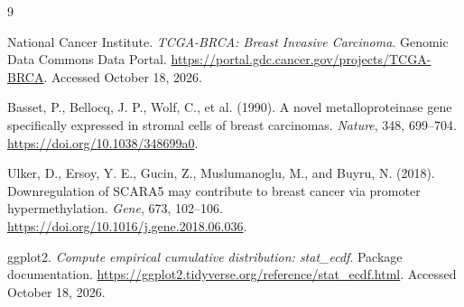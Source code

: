 \documentclass[11pt]{article}
\begin{document}
\begin{thebibliography}{9}

National Cancer Institute.
\textit{TCGA-BRCA: Breast Invasive Carcinoma}.
Genomic Data Commons Data Portal.
\url{https://portal.gdc.cancer.gov/projects/TCGA-BRCA}.
Accessed October 18, 2026.

Basset, P., Bellocq, J. P., Wolf, C., et al. (1990).
A novel metalloproteinase gene specifically expressed
in stromal cells of breast carcinomas.
\textit{Nature}, 348, 699--704.
\url{https://doi.org/10.1038/348699a0}.

Ulker, D., Ersoy, Y. E., Gucin, Z.,
Muslumanoglu, M., and Buyru, N. (2018).
Downregulation of SCARA5 may contribute to breast
cancer via promoter hypermethylation.
\textit{Gene}, 673, 102--106.
\url{https://doi.org/10.1016/j.gene.2018.06.036}.

ggplot2.
\textit{Compute empirical cumulative distribution:
stat\_ecdf}.
Package documentation.
\url{https://ggplot2.tidyverse.org/reference/stat_ecdf.html}.
Accessed October 18, 2026.

\end{thebibliography}
\end{document}
